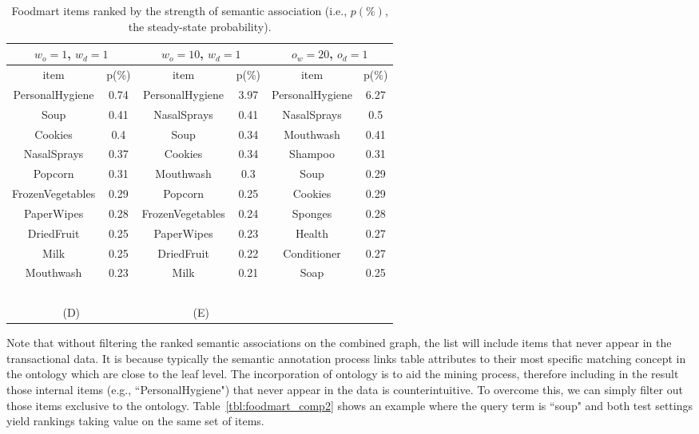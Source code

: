 \begin{table*}[tbh]
\begin{center}
\begin{tabular}{ c c | c c | c c }
\hline
\multicolumn{2}{c|}{$w_o=1$, $w_d=1$}&\multicolumn{2}{c|}{$w_o=10$, $w_d=1$}&\multicolumn{2}{c}{$o_w=20$, $o_d=1$}\\
\hline
item	&	p(\%)	&	item	&	p(\%)	&	item	&	p(\%)	\\
				\hline							
PersonalHygiene	&	0.74	&	PersonalHygiene	&	3.97	&	PersonalHygiene	&	6.27	\\
Soup	&	0.41	&	NasalSprays	&	0.41	&	NasalSprays	&	0.5	\\
Cookies	&	0.4	&	Soup	&	0.34	&	Mouthwash	&	0.41	\\
NasalSprays	&	0.37	&	Cookies	&	0.34	&	Shampoo	&	0.31	\\
Popcorn	&	0.31	&	Mouthwash	&	0.3	&	Soup	&	0.29	\\
FrozenVegetables	&	0.29	&	Popcorn	&	0.25	&	Cookies	&	0.29	\\
PaperWipes	&	0.28	&	FrozenVegetables	&	0.24	&	Sponges	&	0.28	\\
DriedFruit	&	0.25	&	PaperWipes	&	0.23	&	Health	&	0.27	\\
Milk	&	0.25	&	DriedFruit	&	0.22	&	Conditioner	&	0.27	\\
Mouthwash	&	0.23	&	Milk	&	0.21	&	Soap	&	0.25	\\
\hline
\multicolumn{4}{c}{~}\\
\multicolumn{2}{c}{(D)}  &  \multicolumn{2}{c}{(E)}  \\
\end{tabular}
\end{center}
\caption[Top results on the Foodmart dataset.]{\label{tbl:foodmart_comp} Foodmart items ranked by the strength of semantic association (i.e., $p(\%)$, the steady-state probability).}
\end{table*}

Note that without filtering the ranked semantic associations on the combined graph, the list will include items that never appear in the transactional data. It is because typically the semantic annotation process links table attributes to their most specific matching concept in the ontology which are close to the leaf level. The incorporation of ontology is to aid the mining process, therefore including in the result those internal items (e.g., ``PersonalHygiene") that never appear in the data is counterintuitive. To overcome this, we can simply filter out those items exclusive to the ontology. Table~\ref{tbl:foodmart_comp2} shows an example where the query term is ``soup" and both test settings yield rankings taking value on the same set of items.


